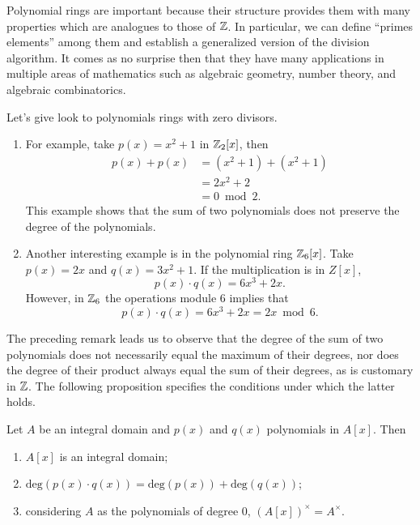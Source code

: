 \documentclass[11pt,a4paper]{article}
\begin{document}
	\begin{rem}
	Polynomial rings are important because their structure provides them with many properties which are analogues to those of $\mathbb{Z}$. In particular, we can define ``primes elements'' among them and establish a generalized version of the division algorithm. It comes as no surprise then that they have many applications in multiple areas of mathematics such as algebraic geometry, number theory, and algebraic combinatorics.
\end{rem}

\begin{exa}
 Let's give look to polynomials rings with zero divisors. 
 \begin{enumerate}[label=(\roman*)]
     \item For example, take $p(x)=x^2+1$ in $\mathbb{Z}_2[x]$, then
     \begin{align*}
     p(x)+p(x)&=(x^2+1)+(x^2+1)\\
     		  &=2x^2+2\\
     		  &=0 \bmod 2.
     \end{align*}
     This example shows that the sum of two polynomials does not preserve the degree of the polynomials.
     \item Another interesting example is in the polynomial ring $\mathbb{Z}_6[x]$. Take $p(x)=2x$ and $q(x)=3x^2+1$. If the multiplication is in $Z[x]$,  \[p(x)\cdot q(x)= 6x^3+2x.\] However, in  $\mathbb{Z}_6$ the operations module $6$ implies that
 \[p(x)\cdot q(x)= 6x^3+2x=2x  \bmod 6.\]
 \end{enumerate}
\end{exa}
The preceding remark leads us to observe that the degree of the sum of two polynomials does not necessarily equal the maximum of their degrees, nor does the degree of their product always equal the sum of their degrees, as is customary in \(\mathbb{Z}\). The following proposition specifies the conditions under which the latter holds.

\begin{prop}
\label{IDfractions}
Let $A$ be an integral domain and $p(x)$ and $q(x)$ polynomials in $A[x].$ Then
\begin{enumerate}
    \item $A[x]$ is an integral domain;
    \item $\text{deg}(p(x)\cdot q(x)) = \text{deg}(p(x))+ \text{deg}(q(x))$;
    \item considering $A$ as the polynomials of degree 0, $(A[x])^{\times}=A^{\times}.$
\end{enumerate}
\end{prop}
\end{document}
